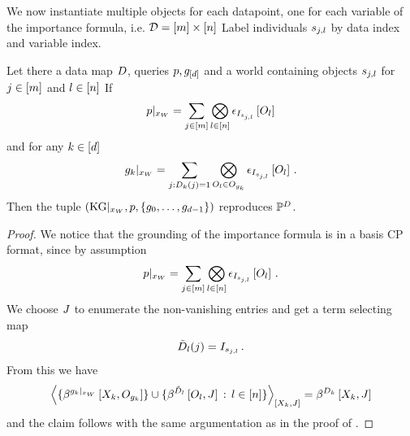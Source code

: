 %
We now instantiate multiple objects for each datapoint, one for each variable of the importance formula, i.e. $\mathcal{D}=[m]\times[n]$
Label individuals $s_{j,l}$ by data index and variable index.

\begin{lemma}
    Let there a data map $D$, queries $p,g_{[d]}$ and a \firstOrderLogic{} world containing objects $s_{j,l}$ for $j\in[m]$ and $l\in[n]$
    If
    \begin{align*}
        {p}|_{x_{W}}
        = \sum_{j\in[m]} \bigotimes_{l\in[n]} \epsilon_{I_{s_{j,l}}}\left[O_{l}\right]
    \end{align*}
    and for any $k\in[d]$
    \begin{align*}
        {g_{k}}|_{x_{W}}
        = \sum_{j : D_{k}(j)=1} \bigotimes_{O_{l} \in O_{g_{k}}}
        \epsilon_{I_{s_{j,l}}}\left[O_{l}\right] \, .
    \end{align*}
    Then the tuple $(\mathrm{KG}|_{x_{W}},p,\{g_{0},\ldots,g_{d-1}\})$ reproduces $\mathbb{P}^{D}$.
\end{lemma}
\begin{proof}
    We notice that the grounding of the importance formula is in a basis CP format, since by assumption
    \begin{align*}
        {p}|_{x_{W}}
        = \sum_{j\in[m]} \bigotimes_{l\in[n]} \epsilon_{I_{s_{j,l}}}\left[O_{l}\right] \, .
    \end{align*}
    We choose $J$ to enumerate the non-vanishing entries and get a term selecting map
    \begin{align*}
        \tilde{D}_{l}(j) = I_{s_{j,l}} \, .
    \end{align*}
    From this we have
    \begin{align*}
        \contractionof{
            \{\bencodingofat{\kggroundingof{\extformulaof{\atomenumerator}}}{\catvariableof{\atomenumerator},\indvariableof{\extformulaof{\atomenumerator}}}\} \cup
            \{\bencodingofat{\secdatamap_{\indenumerator}}{\indvariableof{\indenumerator},\datvariable} \, : \, \indenumeratorin\}
        }{\catvariableof{\catenumerator},\datvariable}
        = \bencodingofat{\datamap_{\atomenumerator}}{\catvariableof{\catenumerator},\datvariable}
    \end{align*}
    and the claim follows with the same argumentation as in the proof of .
\end{proof}


